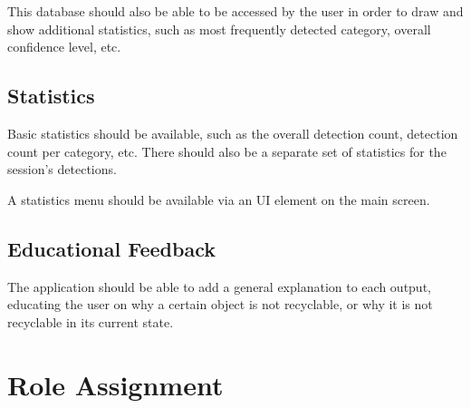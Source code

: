 \documentclass[conference]{IEEEtran}
\begin{document}
This database should also be able to be accessed by the user in order to draw and show additional statistics, such as most frequently detected category, overall confidence level, etc.
\newline
\subsection{Statistics}
Basic statistics should be available, such as the overall detection count, detection count per category, etc. There should also be a separate set of statistics for the session's detections.

A statistics menu should be available via an UI element on the main screen.
\newline
\subsection{Educational Feedback}
The application should be able to add a general explanation to each output, educating the user on why a certain object is not recyclable, or why it is not recyclable in its current state.

\newpage
\section{Role Assignment}
\end{document}
